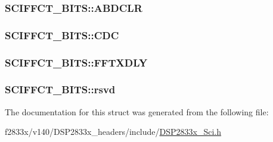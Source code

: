\subsubsection[{A\+B\+D\+C\+L\+R}]{ S\+C\+I\+F\+F\+C\+T\+\_\+\+B\+I\+T\+S\+::\+A\+B\+D\+C\+L\+R}\label{struct_s_c_i_f_f_c_t___b_i_t_s_a610f4b8b72baf4dc1846fb06dede3b2c}
\hypertarget{struct_s_c_i_f_f_c_t___b_i_t_s_ae1972f624fbddcf5e1fe8be0b4161ef9}{}
\subsubsection[{C\+D\+C}]{ S\+C\+I\+F\+F\+C\+T\+\_\+\+B\+I\+T\+S\+::\+C\+D\+C}\label{struct_s_c_i_f_f_c_t___b_i_t_s_ae1972f624fbddcf5e1fe8be0b4161ef9}
\hypertarget{struct_s_c_i_f_f_c_t___b_i_t_s_adcb0aa7cb2ac44f1aaaf9fd93c18523d}{}
\subsubsection[{F\+F\+T\+X\+D\+L\+Y}]{ S\+C\+I\+F\+F\+C\+T\+\_\+\+B\+I\+T\+S\+::\+F\+F\+T\+X\+D\+L\+Y}\label{struct_s_c_i_f_f_c_t___b_i_t_s_adcb0aa7cb2ac44f1aaaf9fd93c18523d}
\hypertarget{struct_s_c_i_f_f_c_t___b_i_t_s_a91647d829e81f817d8e1b4464772483f}{}
\subsubsection[{rsvd}]{ S\+C\+I\+F\+F\+C\+T\+\_\+\+B\+I\+T\+S\+::rsvd}\label{struct_s_c_i_f_f_c_t___b_i_t_s_a91647d829e81f817d8e1b4464772483f}


The documentation for this struct was generated from the following file\+:\begin{DoxyCompactItemize}
\item 
f2833x/v140/\+D\+S\+P2833x\+\_\+headers/include/\hyperlink{_d_s_p2833x___sci_8h}{D\+S\+P2833x\+\_\+\+Sci.\+h}\end{DoxyCompactItemize}
